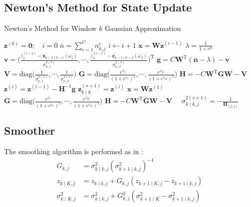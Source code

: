 \documentclass{article}
\newcommand{\g}{\mathbf{g}}
\newcommand{\vv}{\mathbf{v}}
\newcommand{\n}{\mathbf{n}}
\newcommand{\z}{\mathbf{z}}
\newcommand{\G}{\mathbf{G}}
\newcommand{\Hh}{\mathbf{H}}
\newcommand{\W}{\mathbf{W}}
\newcommand{\V}{\mathbf{V}}
\newcommand{\tr}{\text{T}}
\def\*#1{\mathbf{#1}}
\begin{document}
\subsection{Newton's Method for State Update}
\begin{algorithm}
\caption{Newton's Method for Window $k$ Gaussian Approximation}
\label{Newton}
\begin{algorithmic}[1]
\State $\z^{(0)} = \mathbf{0}; \quad i=0$
\State $\bar{n} = \sum_{c=1}^C n^c_{k,j}$
\State $i \leftarrow i + 1$
\State $\*x = \W \z^{(i-1)}$
\State $\lambda = \frac{1}{1 + e^{\*x}}$
\State $\vv = \Big(\frac{z_1^{(i-1)} - \*z_{k-1 \mid k-1}(\omega_1)}{\sigma^{2(s)}_{\nu,1}},
   \cdots, \frac{z_J^{(i-1)} - \*z_{k-1 \mid k-1}(\omega_J)}{\sigma^{2(s)}_{\nu,J}} \Big)^{\tr}$
\State $\g = C\W^{\tr}(\bar{\n} - \lambda) - \vv \quad$ 
\State $\V = \text{diag}\Big( \frac{1}{\sigma^{2(s)}_{\nu,1}}, \cdots, 
   \frac{1}{\sigma^{2(s)}_{\nu,J}}\Big)$
\State $\G = \text{diag}\Big(\frac{e^{x_1}}{(1+e^{x_1})^2}, \cdots, \frac{e^{x_K}}{(1+e^{x_K})^2} \Big) $
\State $\Hh = -C \W^{\tr} \G \W - \V \quad$ 
\State $\z^{(i)} = \z^{(i-1)} - \Hh^{-1}\g$
\EndWhile
\State $\*z^{(s+1)}_{k \mid k} = \z^{(i)}$
\State $\*x = \W \z^{(1)}$
\State $\G = \text{diag}\Big(\frac{e^{x_1}}{(1+e^{x_1})^2}, \cdots, \frac{e^{x_K}}{(1+e^{x_K})^2} \Big) $
\State $\Hh = -C \W^{\tr} \G \W - \V \quad$ 
\State $\sigma^{2(s+1)}_{k \mid k, j} = - \frac{1}{\Hh_{(j,j)}}$
\end{algorithmic}
\end{algorithm}

\subsection{Smoother}
The smoothing algorithm is performed as in \cite{Kim2018}:
\begin{equation}
   \begin{split}
      G_{k,j} &= \sigma^2_{k \mid k, j} (\sigma^2_{k + 1\mid k, j})^{-1} \\
      z_{k \mid K,j} &= z_{k \mid k, j} 
         + G_{k,j} ( z_{k+1 \mid K, j} - z_{k+1 \mid k,j} ) \\
      \sigma^2_{k \mid K,j} &= \sigma^2_{k\mid k,j} + G^2_{k,j}(\sigma^2_{k+1 \mid K} 
         - \sigma^2_{k+1 \mid k, j})
   \end{split}
\end{equation}

\end{document}

